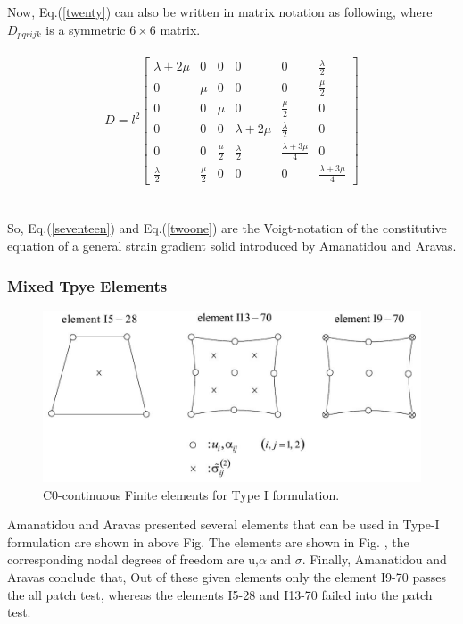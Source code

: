 \documentclass[12pt]{article}
\begin{document}
\\
\\
Now, Eq.(\ref{twenty}) can also be written in matrix notation as following, where $D_{pqrijk}$ is a symmetric $6\times6$ matrix.
\\
\\
\begin{equation}\label{twoone}
D = l^2
\begin{bmatrix}
\lambda + 2\mu & 0 & 0 & 0 & 0 & \frac{\lambda}{2} \\
0 & \mu & 0  & 0  & 0  & \frac{\mu}{2} \\
0 & 0 & \mu & 0  & \frac{\mu}{2}  & 0 \\
0 & 0 & 0 & \lambda + 2\mu & \frac{\lambda}{2} & 0 \\
0 & 0 & \frac{\mu}{2}  & \frac{\lambda}{2} & \frac{\lambda + 3\mu}{4} & 0 \\
 \frac{\lambda}{2} & \frac{\mu}{2} & 0 & 0 & 0 & \frac{\lambda + 3\mu}{4} 
\end{bmatrix}
\end{equation}
\\
\\
So, Eq.(\ref{seventeen}) and Eq.(\ref{twoone}) are the Voigt-notation of the constitutive equation of a general strain gradient solid introduced by Amanatidou and Aravas. 
\newpage
\subsubsection{ Mixed Tpye Elements}
    \begin{figure}[H]
    	\begin{center}
		     \includegraphics[scale=.65]{Element_mixed_type_formulation_E_Amanatidou.JPG}  	
	    \end{center}  
        \caption{C0-continuous Finite elements for Type I formulation. \cite{amanatidou2002mixed}}   
    \end{figure}
Amanatidou and Aravas presented several elements that can be used in Type-I formulation are shown in above Fig. The elements are shown in Fig. , the corresponding nodal degrees of freedom are u,$\alpha$ and $\sigma$. Finally, Amanatidou and Aravas conclude that, Out of these given elements only the element I9-70 passes the all patch test, whereas the elements I5-28 and I13-70 failed into the patch test.
\\
\end{document}
